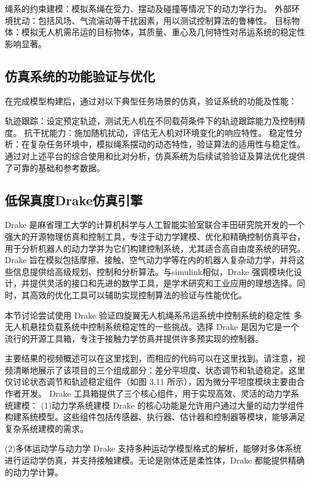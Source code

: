\documentclass[lang=chs, degree=master, blindreview=false, winfonts=true]{yanputhesis}
\begin{document}
绳系的约束建模：模拟系绳在受力、摆动及碰撞等情况下的动力学行为。
外部环境扰动：包括风场、气流湍动等干扰因素，用以测试控制算法的鲁棒性。
目标物体：模拟无人机需吊运的目标物体，其质量、重心及几何特性对吊运系统的稳定性影响显著。
\subsection{仿真系统的功能验证与优化}
在完成模型构建后，通过对以下典型任务场景的仿真，验证系统的功能及性能：

轨迹跟踪：设定预定轨迹，测试无人机在不同载荷条件下的轨迹跟踪能力及控制精度。
抗干扰能力：施加随机扰动，评估无人机对环境变化的响应特性。
稳定性分析：在复杂任务环境中，模拟绳系摆动的动态特性，验证算法的适用性与稳定性。
通过对上述平台的综合使用和比对分析，仿真系统为后续试验验证及算法优化提供了可靠的基础和参考数据。

\subsection{低保真度Drake仿真引擎}
Drake 是麻省理工大学的计算机科学与人工智能实验室联合丰田研究院开发的一个强大的开源物理仿真和控制工具，专注于动力学建模、优化和精确控制仿真平台，用于分析机器人的动力学并为它们构建控制系统，尤其适合高自由度系统的研究。Drake 旨在模拟包括摩擦、接触、空气动力学等在内的机器人复杂动力学，并将这些信息提供给高级规划、控制和分析算法。与simulink相似，Drake 强调模块化设计，并提供灵活的接口和先进的数学工具，是学术研究和工业应用的理想选择。同时，其高效的优化工具可以辅助实现控制算法的验证与性能优化。

本节讨论尝试使用 Drake 验证四旋翼无人机绳系吊运系统中控制系统的稳定性
多无人机悬挂负载系统中控制系统稳定性的一些挑战。选择 Drake 是因为它是一个流行的开源工具箱，专注于接触力学仿真并提供许多预实现的控制器。



主要结果的视频概述可以在这里找到，而相应的代码可以在这里找到。请注意，视频清晰地展示了该项目的三个组成部分：差分平坦度、状态调节和轨迹稳定。这里仅讨论状态调节和轨迹稳定组件（如图 3.11 所示），因为微分平坦度模块主要由合作者开发。
Drake 工具箱提供了三个核心组件，用于实现高效、灵活的动力学系统建模：
(1)动力学系统建模
Drake 的核心功能是允许用户通过大量的动力学组件构建系统模型。这些组件包括传感器、执行器、估计器和控制器等模块，能够满足复杂系统建模的需求。

(2)多体运动学与动力学
Drake 支持多种运动学模型格式的解析，能够对多体系统进行运动学仿真，并支持接触建模。无论是刚体还是柔性体，Drake 都能提供精确的动力学计算。
\end{document}
